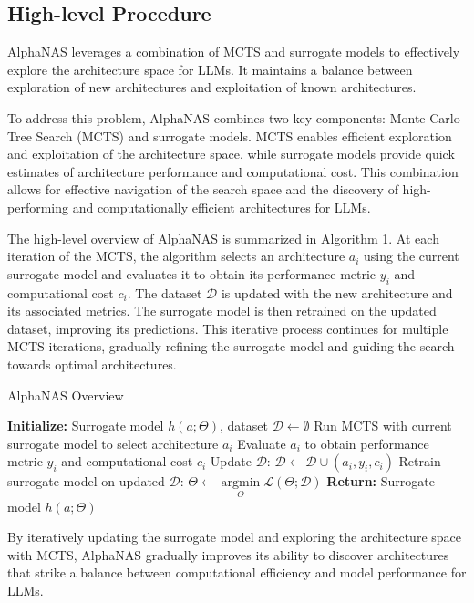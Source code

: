\documentclass{article}
\begin{document}
\subsection{High-level Procedure}
AlphaNAS leverages a combination of MCTS and surrogate models to effectively explore the architecture space for LLMs. It maintains a balance between exploration of new architectures and exploitation of known architectures.

To address this problem, AlphaNAS combines two key components: Monte Carlo Tree Search (MCTS) and surrogate models. MCTS enables efficient exploration and exploitation of the architecture space, while surrogate models provide quick estimates of architecture performance and computational cost. This combination allows for effective navigation of the search space and the discovery of high-performing and computationally efficient architectures for LLMs.

The high-level overview of AlphaNAS is summarized in Algorithm 1. At each iteration of the MCTS, the algorithm selects an architecture $a_i$ using the current surrogate model and evaluates it to obtain its performance metric $y_i$ and computational cost $c_i$. The dataset $\mathcal{D}$ is updated with the new architecture and its associated metrics. The surrogate model is then retrained on the updated dataset, improving its predictions. This iterative process continues for multiple MCTS iterations, gradually refining the surrogate model and guiding the search towards optimal architectures.

\begin{algorithm}
\caption{AlphaNAS Overview}
\begin{algorithmic}[1]
\STATE \textbf{Initialize:} Surrogate model $h(a;\Theta)$, dataset $\mathcal{D} \gets \emptyset$
\STATE Run MCTS with current surrogate model to select architecture $a_i$
\STATE Evaluate $a_i$ to obtain performance metric $y_i$ and computational cost $c_i$
\STATE Update $\mathcal{D}$: $\mathcal{D} \gets \mathcal{D} \cup {(a_i, y_i, c_i)}$
\STATE Retrain surrogate model on updated $\mathcal{D}$: $\Theta \gets \underset{\Theta}{\operatorname{argmin}} \mathcal{L}(\Theta; \mathcal{D})$
\ENDFOR
\STATE \textbf{Return:} Surrogate model $h(a;\Theta)$
\end{algorithmic}
\end{algorithm}

By iteratively updating the surrogate model and exploring the architecture space with MCTS, AlphaNAS gradually improves its ability to discover architectures that strike a balance between computational efficiency and model performance for LLMs.
\end{document}
